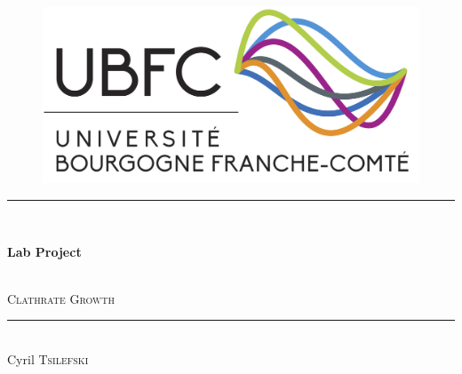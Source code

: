 \thispagestyle{empty}
\setcounter{page}{0}
\begin{center}
    \begin{figure}[!hb]
        \centering
        \includegraphics[width=.7\linewidth]{figures/logo-ubfc.png}
    \end{figure}
    \vspace{7\baselineskip}
    \rule{0.75\textwidth}{1pt}\\
    \vspace{\baselineskip}
    \begin{Huge}\textbf{Lab Project}\end{Huge}\\
    \vspace{0.5\baselineskip}
    \Large \textsc{Clathrate Growth} \normalsize \\
    \rule{0.75\textwidth}{1pt}\\
    \vspace{\baselineskip}
    \vspace{\baselineskip}
    \vspace{\baselineskip}
    \vspace{\baselineskip}
    \vspace{\baselineskip}
    {\LARGE Cyril \textsc{Tsilefski}}\\
\end{center}
\vfill

\setcounter{figure}{0}
